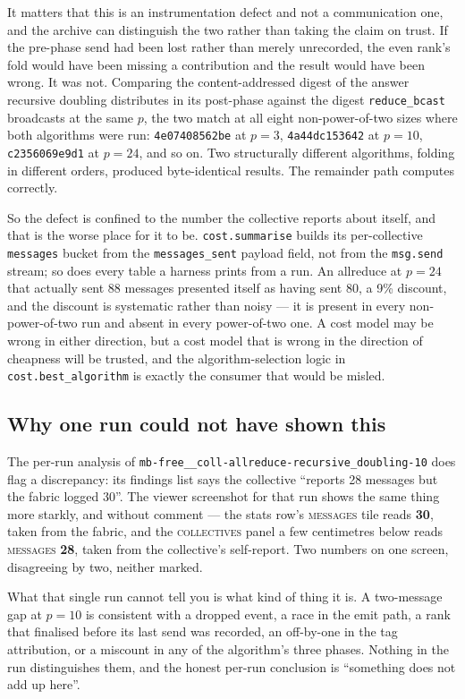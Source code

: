 \documentclass[11pt]{article}
\begin{document}
It matters that this is an instrumentation defect and not a communication one, and the archive
can distinguish the two rather than taking the claim on trust. If the pre-phase send had been
lost rather than merely unrecorded, the even rank's fold would have been missing a contribution
and the result would have been wrong. It was not. Comparing the content-addressed digest of the
answer recursive doubling distributes in its post-phase against the digest
\texttt{reduce\_bcast} broadcasts at the same $p$, the two match at all eight non-power-of-two
sizes where both algorithms were run: \texttt{4e07408562be} at $p=3$, \texttt{4a44dc153642} at
$p=10$, \texttt{c2356069e9d1} at $p=24$, and so on. Two structurally different algorithms,
folding in different orders, produced byte-identical results. The remainder path computes
correctly.

So the defect is confined to the number the collective reports about itself, and that is the
worse place for it to be. \texttt{cost.summarise} builds its per-collective
\texttt{messages} bucket from the \texttt{messages\_sent} payload field, not from the
\texttt{msg.send} stream; so does every table a harness prints from a run. An allreduce at
$p=24$ that actually sent 88 messages presented itself as having sent 80, a 9\% discount, and the
discount is systematic rather than noisy --- it is present in every non-power-of-two run and
absent in every power-of-two one. A cost model may be wrong in either direction, but a cost
model that is wrong in the direction of cheapness will be trusted, and the algorithm-selection
logic in \texttt{cost.best\_algorithm} is exactly the consumer that would be misled.

\subsection{Why one run could not have shown this}

The per-run analysis of \texttt{mb-free\_\_coll-allreduce-recursive\_doubling-10} does flag a
discrepancy: its findings list says the collective ``reports 28 messages but the fabric logged
30''. The viewer screenshot for that run shows the same thing more starkly, and without comment
--- the stats row's \textsc{messages} tile reads \textbf{30}, taken from the fabric, and the
\textsc{collectives} panel a few centimetres below reads \textsc{messages} \textbf{28}, taken
from the collective's self-report. Two numbers on one screen, disagreeing by two, neither marked.

What that single run cannot tell you is what kind of thing it is. A two-message gap at $p=10$ is
consistent with a dropped event, a race in the emit path, a rank that finalised before its last
send was recorded, an off-by-one in the tag attribution, or a miscount in any of the algorithm's
three phases. Nothing in the run distinguishes them, and the honest per-run conclusion is
``something does not add up here''.
\end{document}
